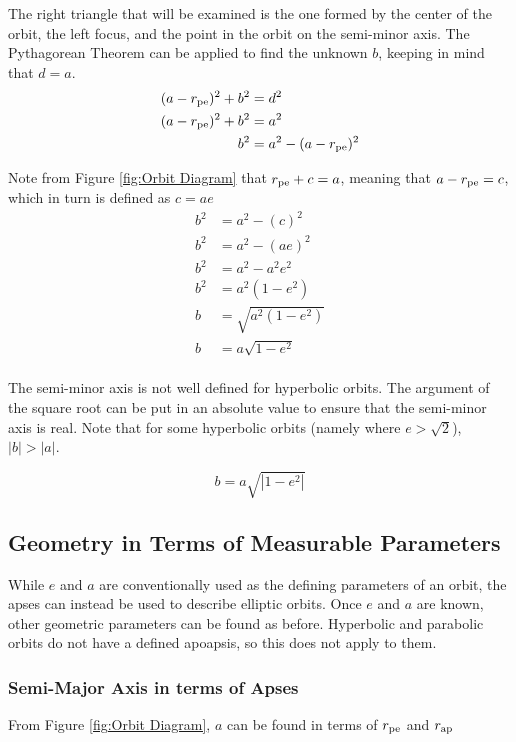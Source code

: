 \documentclass[../basicOrbitalDynamics.tex]{subfiles}
\begin{document}
The right triangle that will be examined is the one formed by the center of the orbit, the left focus, and the point in the orbit on the semi-minor axis. The Pythagorean Theorem can be applied to find the unknown $b$, keeping in mind that $d=a$.
\begin{align*}
    (a-{r}_\text{pe})^2+b^2 & = d^2                   \\
    (a-{r}_\text{pe})^2+b^2 & = a^2                   \\
    b^2                   & = a^2-(a-{r}_\text{pe})^2 \\
\end{align*}

Note from Figure \ref{fig:Orbit Diagram} that ${r}_\text{pe}+c=a$, meaning that $a-{r}_\text{pe}=c$, which in turn is defined as $c=ae$
\begin{align*}
    b^2 & = a^2-(c)^2         \\
    b^2 & = a^2-(ae)^2        \\
    b^2 & = a^2-a^2e^2        \\
    b^2 & = a^2(1-e^2)        \\
    b   & = \sqrt{a^2(1-e^2)} \\
    b   & = a\sqrt{1-e^2}     \\
\end{align*}

The semi-minor axis is not well defined for hyperbolic orbits. The argument of the square root can be put in an absolute value to ensure that the semi-minor axis is real. Note that for some hyperbolic orbits (namely where $e>\sqrt{2}$), $|b|>|a|$.

\begin{equation}\label{Semi Minor Axis Geometric}
    b=a\sqrt{|1-e^2|}
\end{equation}

\bigskip\bigskip
\subsection{Geometry in Terms of Measurable Parameters}\label{sec:Geometry in terms of Measurable Values}

While $e$ and $a$ are conventionally used as the defining parameters of an orbit, the apses can instead be used to describe elliptic orbits. Once $e$ and $a$ are known, other geometric parameters can be found as before. Hyperbolic and parabolic orbits do not have a defined apoapsis, so this does not apply to them.

\subsubsection{Semi-Major Axis in terms of Apses}
From Figure \ref{fig:Orbit Diagram}, $a$ can be found in terms of ${r}_\text{pe}$ and ${r}_\text{ap}$
\end{document}

